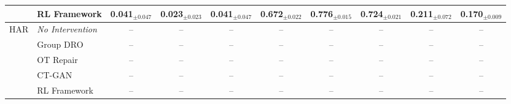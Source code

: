 \begin{table}[t]
\begin{tabular}{llcccccccc}
 & RL Framework & 0.041$_{\pm 0.047}$ & 0.023$_{\pm 0.023}$ & 0.041$_{\pm 0.047}$ & 0.672$_{\pm 0.022}$ & 0.776$_{\pm 0.015}$ & 0.724$_{\pm 0.021}$ & 0.211$_{\pm 0.072}$ & 0.170$_{\pm 0.009}$ \\
\midrule
\multirow{5}{*}{HAR} & \textit{No Intervention} & -- & -- & -- & -- & -- & -- & -- & -- \\
 & Group DRO & -- & -- & -- & -- & -- & -- & -- & -- \\
 & OT Repair & -- & -- & -- & -- & -- & -- & -- & -- \\
 & CT-GAN & -- & -- & -- & -- & -- & -- & -- & -- \\
 & RL Framework & -- & -- & -- & -- & -- & -- & -- & -- \\
\bottomrule
\end{tabular}
\end{table}
